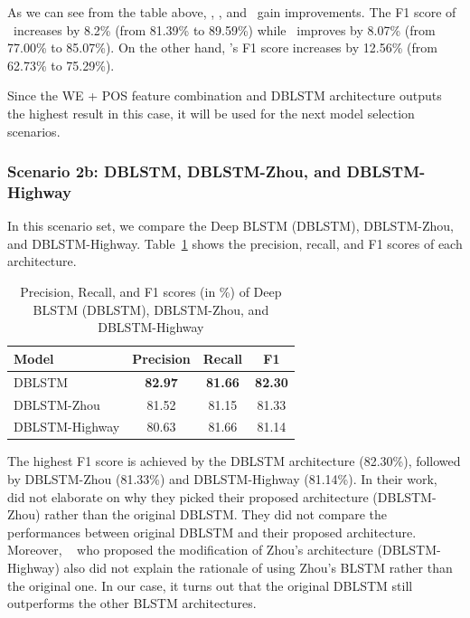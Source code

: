 As we can see from the table above, \agent, \patient, and \greet~gain improvements. The F1 score of \agent~increases by 8.2\% (from 81.39\% to 89.59\%) while \patient~improves by 8.07\% (from 77.00\% to 85.07\%). On the other hand, \greet's F1 score increases by 12.56\% (from 62.73\% to 75.29\%).

Since the WE + POS feature combination and DBLSTM architecture outputs the highest result in this case, it will be used for the next model selection scenarios.

\subsubsection{Scenario 2b: DBLSTM, DBLSTM-Zhou, and DBLSTM-Highway}
In this scenario set, we compare the Deep BLSTM (DBLSTM), DBLSTM-Zhou, and DBLSTM-Highway. Table~\ref{tab:modelselection2} shows the precision, recall, and F1 scores of each architecture.

\begin{table}
	\caption{Precision, Recall, and F1 scores (in \%) of Deep BLSTM (DBLSTM), DBLSTM-Zhou, and DBLSTM-Highway}
	\centering
	\label{tab:modelselection2}
	\begin{tabular}{lccc}
		\hline
		Model & Precision & Recall & F1 \\
		\hline		\hline
		DBLSTM & \textbf{82.97} & \textbf{81.66} & \textbf{82.30} \\
		DBLSTM-Zhou & 81.52 & 81.15 & 81.33 \\
		DBLSTM-Highway & 80.63 & 81.66 & 81.14 \\
		\hline
	\end{tabular}

\end{table}

The highest F1 score is achieved by the DBLSTM architecture (82.30\%), followed by DBLSTM-Zhou (81.33\%) and DBLSTM-Highway (81.14\%). In their work, ~\cite{zhou2015end} did not elaborate on why they picked their proposed architecture (DBLSTM-Zhou) rather than the original DBLSTM. They did not compare the performances between original DBLSTM and their proposed architecture. Moreover, ~\cite{he2017deep} who proposed the modification of Zhou's architecture (DBLSTM-Highway) also did not explain the rationale of using Zhou's BLSTM rather than the original one. In our case, it turns out that the original DBLSTM still outperforms the other BLSTM architectures. 

